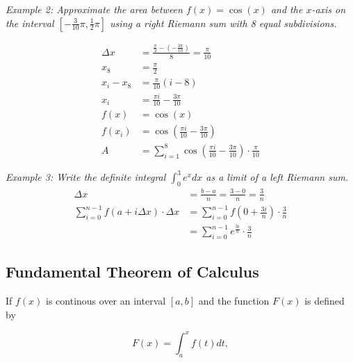 \documentclass{article}
\begin{document}
            \noindent \color{blue} \textit{Example 2: Approximate the area between $f(x)=\cos{(x)}$
            and the $x$-axis on the interval $\left[-\frac{3}{10}\pi, \frac{1}{2}\pi\right]$ using
            a right Riemann sum with 8 equal subdivisions.} \color{black}

            \begin{align*}
                \Delta x    &= \frac{\frac{\pi}{2}-\left(-\frac{3\pi}{10}\right)}{8} = \frac{\pi}{10} \\
                x_8         &= \frac{\pi}{2} \\
                x_i - x_8   &= \frac{\pi}{10} (i-8) \\
                x_i         &= \frac{\pi i}{10} - \frac{3\pi}{10} \\
                f(x)        &= \cos{(x)} \\
                f(x_i)      &= \cos{\left(\frac{\pi i}{10}-\frac{3\pi}{10}\right)} \\
                A           &= \sum^8_{i=1}\cos{\left(\frac{\pi i}{10}-\frac{3\pi}{10}\right)}
                               \cdot\frac{\pi}{10}
            \end{align*}

            \noindent \color{blue} \textit{Example 3: Write the definite integral $\int^3_0 e^x dx$
            as a limit of a left Riemann sum.} \color{black} \\

            \begin{align*}
                \Delta x                                    &= \frac{b-a}{n} = \frac{3-0}{n} = \frac{3}{n} \\
                \sum^{n-1}_{i=0}f(a+i\Delta x)\cdot\Delta x &= \sum^{n-1}_{i=0} f\left(0+\frac{3i}{n}\right)
                                                               \cdot \frac{3}{n} \\
                                                            &= \sum^{n-1}_{i=0} e^{\frac{3i}{n}}\cdot\frac{3}{n}
            \end{align*}


        \subsection{Fundamental Theorem of Calculus}
            If $f(x)$ is continous over an interval $[a,b]$ and the function $F(x)$ is defined by

            \begin{equation*}
                F(x) = \int^x_a f(t)dt,
            \end{equation*}
\end{document}

